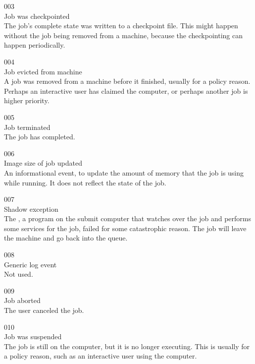 \noindent{} 003 \\
 Job was checkpointed \\
 The job's complete state was written to a checkpoint
file.  
This might happen without the job being removed from a machine,
because the checkpointing can happen periodically. 

\noindent{} 004 \\
 Job evicted from machine \\
 A job was removed from a machine before it finished,
usually for a policy reason. Perhaps an interactive user has claimed
the computer, or perhaps another job is higher priority.

\noindent{} 005 \\
 Job terminated \\
 The job has completed.

\noindent{} 006 \\
 Image size of job updated \\
 An informational event, 
to update the amount of memory that the job is using while running. 
It does not reflect the state of the job.

\noindent{} 007 \\
 Shadow exception \\
The , a program on the submit computer that watches
over the job and performs some services for the job, failed for some
catastrophic reason. The job will leave the machine and go back into
the queue.

\noindent{} 008 \\
 Generic log event \\
 Not used.

\noindent{} 009 \\
 Job aborted \\
 The user canceled the job.

\noindent{} 010 \\
 Job was suspended \\
 The job is still on the computer, but it is no longer
executing. 
This is usually for a policy reason, such as an interactive user using
the computer. 

